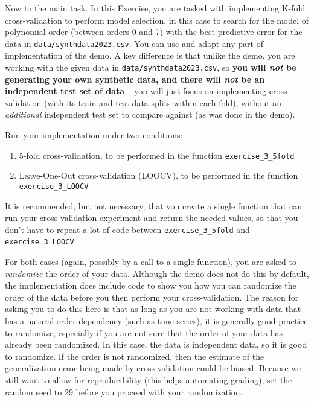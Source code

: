 \documentclass[10pt]{article}
\begin{document}
\begin{itemize}
Now to the main task. In this Exercise, you are tasked with implementing K-fold cross-validation to perform model selection, in this case to search for the model of polynomial order (between orders 0 and 7) with the best predictive error for the data in {\tt data/synthdata2023.csv}. You can use and adapt any part of implementation of the demo. A key difference is that unlike the demo, you are working with the given data in {\tt data/synthdata2023.csv}, so {\bf you will {\em not} be generating your own synthetic data, and there will {\em not} be an independent test set of data} -- you will just focus on implementing  cross-validation (with its train and test data splits within each fold), without an {\em additional} independent test set to compare against (as was done in the demo).

Run your implementation under two conditions:
\begin{enumerate}
\item 5-fold cross-validation, to be performed in the function {\tt exercise\_3\_5fold}
\item Leave-One-Out cross-validation (LOOCV), to be performed in the function {\tt exercise\_3\_LOOCV}
\end{enumerate}
It is recommended, but not necessary, that you create a single function that can run your cross-validation experiment and return the needed values, so that you don't have to repeat a lot of code between {\tt exercise\_3\_5fold} and {\tt exercise\_3\_LOOCV}.

For both cases (again, possibly by a call to a single function), you are asked to {\em randomize} the order of your data. Although the demo does not do this by default, the implementation does include code to show you how you can randomize the order of the data before you then perform your cross-validation. The reason for asking you to do this here is that as long as you are not working with data that has a natural order dependency (such as time series), it is generally good practice to randomize, especially if you are not sure that the order of your data has already been randomized. In this case, the data is independent data, so it is good to randomize. If the order is not randomized, then the estimate of the generalization error being made by cross-validation could be biased. Because we still want to allow for reproducibility (this helps automating grading), set the random seed to 29 before you proceed with your randomization.


\end{itemize}
\end{document}
